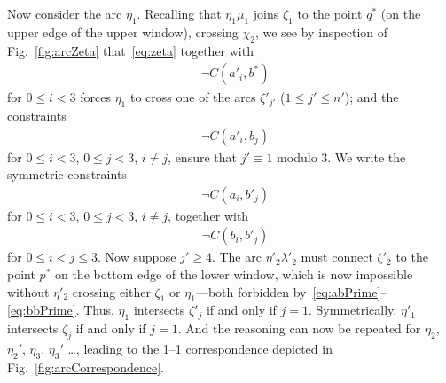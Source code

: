 \documentclass{article}
\begin{document}
Now consider the arc $\eta_1$. Recalling that $\eta_1\mu_1$ joins
$\zeta_1$ to the point $q^*$ (on the upper edge of the upper window),
crossing $\chi_2$, we see by inspection of Fig.~\ref{fig:arcZeta}
that~\eqref{eq:zeta} together with
\begin{align*}
&  \neg C(a'_i, b^*)
\end{align*}
for $0 \leq i < 3$
forces $\eta_1$ to cross one of the arcs
$\zeta'_{j'}$ ($1 \leq j' \leq n'$); and the constraints
\begin{align*}
& \neg C(a'_i,b_j)
\end{align*}
for $0 \leq i < 3$, $0 \leq j < 3$, $i \neq j$, ensure that $j' \equiv
1 $ modulo 3. We write the symmetric constraints
\begin{align}
& \neg C(a_i,b'_j)
\label{eq:abPrime}
\end{align}
for $0 \leq i < 3$, $0 \leq j < 3$, $i \neq j$, together with 
\begin{align}
& \neg C(b_i,b'_j)
\label{eq:bbPrime}
\end{align}
for $0 \leq i < j \leq 3$.  Now suppose $j' \geq 4$.  The arc $\eta'_2
\lambda'_2$ must connect $\zeta'_2$ to the point $p^*$ on the bottom
edge of the lower window, which is now impossible without $\eta'_2$
crossing either $\zeta_1$ or $\eta_1$---both forbidden
by~\eqref{eq:abPrime}--\eqref{eq:bbPrime}.  Thus, $\eta_1$ intersects
$\zeta'_j$ if and only if $j = 1$. Symmetrically, $\eta'_1$ intersects
$\zeta_j$ if and only if $j = 1$.  And the reasoning can now be
repeated for $\eta_2$, $\eta_2'$, $\eta_3$, $\eta_3'$ \ldots, leading
to the 1--1 correspondence depicted in
Fig.~\ref{fig:arcCorrespondence}.
\end{document}
